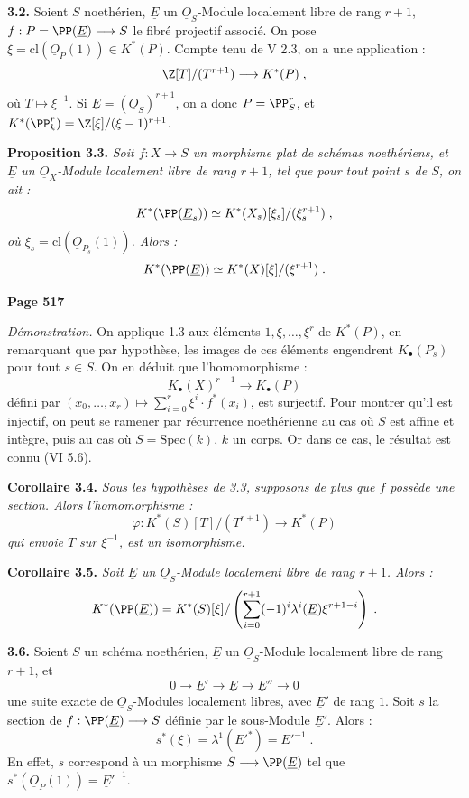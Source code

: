 \smallskip
\noindent\textbf{3.2.} Soient $S$ noeth\'erien, $\underline{E}$ un $\underline{O}_S$-Module localement libre de rang $r+1$, $f : P = \PP(\underline{E}) \longrightarrow S$ le fibr\'e projectif associ\'e. On pose $\xi = \mathrm{cl}(\underline{O}_P(1)) \in K^*(P)$. Compte tenu de V 2.3, on a une application :
\[
\Z[T]/(T^{r+1}) \longrightarrow K^*(P)\;,
\]
o\`u $T \mapsto \xi^{-1}$. Si $\underline{E} = (\underline{O}_S)^{r+1}$, on a donc $P = \PP_S^r$, et $K^*(\PP_k^r) = \Z[\xi]/(\xi-1)^{r+1}$.

\smallskip
\noindent\textbf{Proposition 3.3.} \textit{Soit $f : X \longrightarrow S$ un morphisme plat de sch\'emas noeth\'eriens, et $\underline{E}$ un $\underline{O}_X$-Module localement libre de rang $r+1$, tel que pour tout point $s$ de $S$, on ait :
\[
K^*(\PP(\underline{E}_s)) \simeq K^*(X_s)[\xi_s]/(\xi_s^{r+1})\;,
\]
o\`u $\xi_s = \mathrm{cl}(\underline{O}_{P_s}(1))$. Alors :
\[
K^*(\PP(\underline{E})) \simeq K^*(X)[\xi]/(\xi^{r+1})\;.
\]}

\newpage
\noindent\textbf{Page 517}

\textit{D\'emonstration.} On applique 1.3 aux \'el\'ements $1, \xi, \ldots, \xi^r$ de $K^*(P)$, en remarquant que par hypoth\`ese, les images de ces \'el\'ements engendrent $K_\bullet(P_s)$ pour tout $s \in S$. On en d\'eduit que l'homomorphisme :
\[
K_\bullet(X)^{r+1} \longrightarrow K_\bullet(P)
\]
d\'efini par $(x_0, \ldots, x_r) \mapsto \sum_{i=0}^r \xi^i \cdot f^*(x_i)$, est surjectif. Pour montrer qu'il est injectif, on peut se ramener par r\'ecurrence noeth\'erienne au cas o\`u $S$ est affine et int\`egre, puis au cas o\`u $S = \mathrm{Spec}(k)$, $k$ un corps. Or dans ce cas, le r\'esultat est connu (VI 5.6).

\smallskip
\noindent\textbf{Corollaire 3.4.} \textit{Sous les hypoth\`eses de 3.3, supposons de plus que $f$ poss\`ede une section. Alors l'homomorphisme :
\[
\varphi : K^*(S)[T]/(T^{r+1}) \longrightarrow K^*(P)
\]
qui envoie $T$ sur $\xi^{-1}$, est un isomorphisme.}

\smallskip
\noindent\textbf{Corollaire 3.5.} \textit{Soit $\underline{E}$ un $\underline{O}_S$-Module localement libre de rang $r+1$. Alors :
\[
K^*(\PP(\underline{E})) = K^*(S)[\xi]/\left(\sum_{i=0}^{r+1} (-1)^i \lambda^i(\underline{E}) \xi^{r+1-i}\right)\;.
\]}

\smallskip
\noindent\textbf{3.6.} Soient $S$ un sch\'ema noeth\'erien, $\underline{E}$ un $\underline{O}_S$-Module localement libre de rang $r+1$, et
\[
0 \longrightarrow \underline{E}' \longrightarrow \underline{E} \longrightarrow \underline{E}'' \longrightarrow 0
\]
une suite exacte de $\underline{O}_S$-Modules localement libres, avec $\underline{E}'$ de rang $1$. Soit $s$ la section de $f : \PP(\underline{E}) \longrightarrow S$ d\'efinie par le sous-Module $\underline{E}'$. Alors :
\[
s^*(\xi) = \lambda^1(\underline{E}'^*) = \underline{E}'^{-1}\;.
\]
En effet, $s$ correspond \`a un morphisme $S \longrightarrow \PP(\underline{E})$ tel que $s^*(\underline{O}_P(1)) = \underline{E}'^{-1}$.

